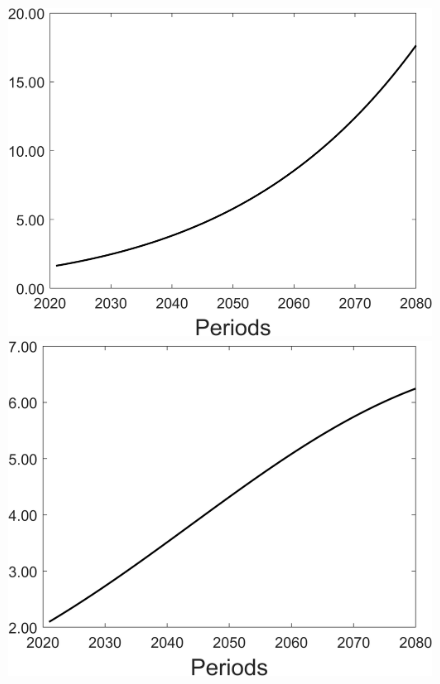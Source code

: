 \begin{figure}[h!!]
\begin{minipage}[]{0.32\textwidth}
	\end{minipage}
	\begin{minipage}[]{0.32\textwidth}
		\includegraphics[width=1\textwidth]{../../codding_model/Own/figures/Rep_agent/staticonlyRam_separate_yd_periods59_eppsilon0.40_zeta1.40_Ad08_Ac04_thetac0.70_thetad0.56_HetGrowth1_tauul0.181_util0_withtarget0_lgd0.png}
	\end{minipage}
	\begin{minipage}[]{0.32\textwidth}
		\includegraphics[width=1\textwidth]{../../codding_model/Own/figures/Rep_agent/staticonlyRam_separate_xd_periods59_eppsilon0.40_zeta1.40_Ad08_Ac04_thetac0.70_thetad0.56_HetGrowth1_tauul0.181_util0_withtarget0_lgd0.png}

\end{minipage}
\end{figure}
